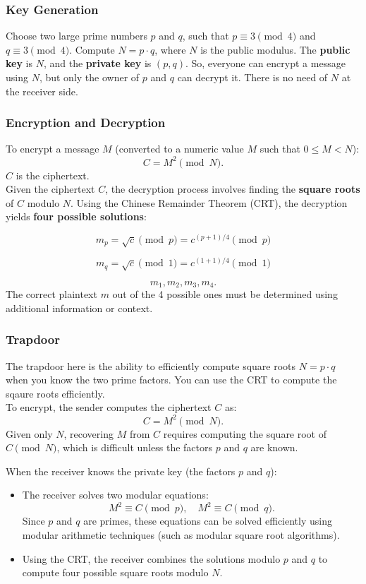 \subsubsection{Key Generation}
Choose two large prime numbers \( p \) and \( q \), such that \( p \equiv 3 \pmod{4} \) and \( q \equiv 3 \pmod{4} \).
Compute \( N = p \cdot q \), where \( N \) is the public modulus.
The \textbf{public key} is \( N \), and the \textbf{private key} is \( (p, q) \).
So, everyone can encrypt a message using \( N \), but only the owner of \( p \) and \( q \) can decrypt it. There is no need of $N$ at the receiver side.

\subsubsection{Encryption and Decryption}
To encrypt a message \( M \) (converted to a numeric value \( M \) such that \( 0 \leq M < N \)):
    \[
    C = M^2 \pmod{N}.
    \]
\( C \) is the ciphertext. \\

Given the ciphertext \( C \), the decryption process involves finding the \textbf{square roots} of \( C \) modulo \( N \).
Using the Chinese Remainder Theorem (CRT), the decryption yields \textbf{four possible solutions}:
   
\[ m_p = \sqrt{c} \pmod{p} = c^{(p+1)/4} \pmod{p}\]

\[ m_q = \sqrt{c} \pmod{1} = c^{(1+1)/4} \pmod{1}\]

\[
    m_1, m_2, m_3, m_4.
    \]
The correct plaintext \( m \) out of the 4 possible ones must be determined using additional information or context.

\subsubsection{Trapdoor}
The trapdoor here is the ability to efficiently compute square roots $N = p\cdot q$ when you know the two prime factors. You can use the CRT to compute the sqaure roots efficiently. \\

To encrypt, the sender computes the ciphertext \( C \) as:
\[
C = M^2 \pmod{N}.
\]
Given only \( N \), recovering \( M \) from \( C \) requires computing the square root of \( C \pmod{N} \), which is difficult unless the factors \( p \) and \( q \) are known.

When the receiver knows the private key (the factors \( p \) and \( q \)):
\begin{itemize}
    \item The receiver solves two modular equations:
    \[
    M^2 \equiv C \pmod{p}, \quad M^2 \equiv C \pmod{q}.
    \]
    Since \( p \) and \( q \) are primes, these equations can be solved efficiently using modular arithmetic techniques (such as modular square root algorithms).

    \item Using the CRT, the receiver combines the solutions modulo \( p \) and \( q \) to compute four possible square roots modulo \( N \).
\end{itemize}

